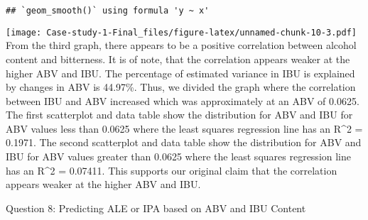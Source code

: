 \documentclass[
]{article}
\begin{document}
\begin{verbatim}
## `geom_smooth()` using formula 'y ~ x'
\end{verbatim}

\texttt{[image: Case-study-1-Final\_files/figure-latex/unnamed-chunk-10-3.pdf]}
From the third graph, there appears to be a positive correlation between
alcohol content and bitterness. It is of note, that the correlation
appears weaker at the higher ABV and IBU. The percentage of estimated
variance in IBU is explained by changes in ABV is 44.97\%. Thus, we
divided the graph where the correlation between IBU and ABV increased
which was approximately at an ABV of 0.0625. The first scatterplot and
data table show the distribution for ABV and IBU for ABV values less
than 0.0625 where the least squares regression line has an R\^{}2 =
0.1971. The second scatterplot and data table show the distribution for
ABV and IBU for ABV values greater than 0.0625 where the least squares
regression line has an R\^{}2 = 0.07411. This supports our original
claim that the correlation appears weaker at the higher ABV and IBU.

Question 8: Predicting ALE or IPA based on ABV and IBU Content
\end{document}
